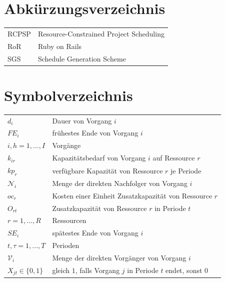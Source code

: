 \documentclass[a4paper,12pt,parskip,bibtotoc,liststotoc]{article}
\begin{document}
\newpage
\section*{Abkürzungsverzeichnis}
\begin{table}[h!]
    \vspace*{-3mm}
    \hspace*{2mm}
  \renewcommand{\arraystretch}{1,5}
    \begin{tabular}{ll}  %
           RCPSP      & Resource-Constrained Project Scheduling \\
           RoR & Ruby on Rails \\
SGS & Schedule Generation Scheme\\
	\end{tabular}
\end{table}
\newpage
\section*{Symbolverzeichnis}
\begin{table}[h!]
    \vspace*{-3mm}
        \hspace*{2mm}
      \renewcommand{\arraystretch}{1,5}
    \begin{tabular}{ll} 
$d_i$ & Dauer von Vorgang $i$ \\
$FE_i$& frühestes Ende von Vorgang $i$\\
$i,h=1,...,I$ & Vorgänge \\
$k_{ir}$& Kapazitätsbedarf von Vorgang $i$ auf Ressource $r$\\
$kp_r$ & verfügbare Kapazität von Ressource $r$ je Periode\\
$\mathcal{N}_i$ & Menge der direkten Nachfolger von Vorgang $i$ \\
$oc_r$ & Kosten einer Einheit Zusatzkapazität von Ressource $r$ \\
$O_{rt}$ & Zusatzkapazität von Ressource $r$ in Periode $t$ \\
$r=1,...,R$ & Ressourcen \\
$SE_i$& spätestes Ende von Vorgang $i$\\
$t,\tau=1,..., T$ & Perioden\\
$\mathcal{V}_i$ & Menge der direkten Vorgänger von Vorgang $i$ \\
$X_{jt}\in\{0,1\}$ & gleich $1$, falls Vorgang $j$ in Periode $t$ endet, sonst $0$
  	\end{tabular}
\end{table}
\newpage
{}   %
\end{document}
